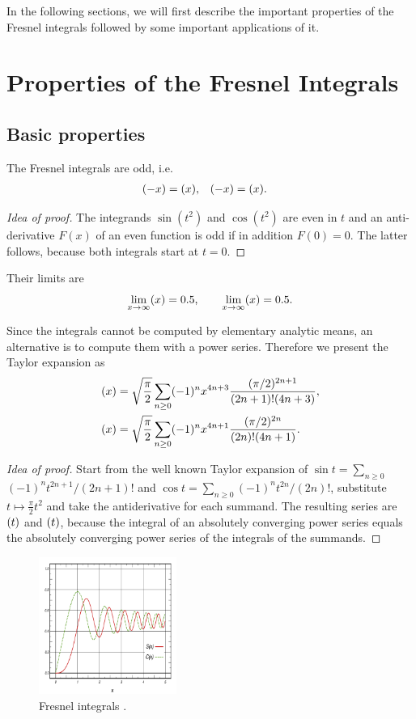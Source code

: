 \documentclass[12pt]{article}
\let\C=\relax
\DeclareMathOperator\C{C} %
\def\d#1{{\,\ud#1\,}}
\let\S=\relax
\DeclareMathOperator\S{S} %
\begin{document}
In the following sections, we will first describe the important properties of the Fresnel integrals followed by some important applications of it.

\section{Properties of the Fresnel Integrals}
\subsection{Basic properties}
The Fresnel integrals are odd, i.e.
\begin{align*}
	\S(-x) &= \S(x), & \C(-x) &= \C(x).
\end{align*}
\begin{proof}[Idea of proof]  The integrands $\sin(t^2)$ and $\cos(t^2)$ are even in $t$ and an anti-derivative $F(x)$ of an even function is odd if in addition $F(0)=0$.  The latter follows, because both integrals start at $t=0$.
\end{proof}

Their limits are
\[  \lim_{x\to\infty} \S(x) = 0.5,\qquad  \lim_{x\to\infty} \C(x) = 0.5.
\]

Since the integrals cannot be computed by elementary analytic means, an alternative is to compute them with a power series.  Therefore we present the Taylor expansion as
\begin{align*}
  \S(x) &= \sqrt{\frac\pi2}\sum_{n\ge0} (-1)^nx^{4n+3}\frac{(\pi/2)^{2n+1}}{(2n+1)!(4n+3)}, \\
  \C(x) &= \sqrt{\frac\pi2}\sum_{n\ge0} (-1)^nx^{4n+1}\frac{(\pi/2)^{2n}}{(2n)!(4n+1)}.
\end{align*}
\begin{proof}[Idea of proof]  Start from the well known Taylor expansion of $\sin t = \sum_{n\ge0}$ $(-1)^n t^{2n+1}/(2n+1)!$ and $\cos t = \sum_{n\ge0} (-1)^nt^{2n}/(2n)!$, substitute $t\mapsto \tfrac\pi2 t^2$ and take the antiderivative for each summand.  The resulting series are $\S(t)$ and $\C(t)$, because the integral of an absolutely converging power series equals the absolutely converging power series of the integrals of the summands.
\end{proof}

\begin{figure}[h!]
	\centering
	\includegraphics[width=0.4\textwidth]{Fresnel-Integrals-(Normalised).png}
	\caption{Fresnel integrals \cite{wiki}.}
\end{figure}
\end{document}
